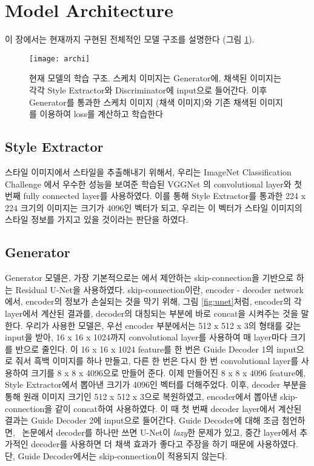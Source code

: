 \section{Model Architecture}
\label{sec:archi}
이 장에서는 현재까지 구현된 전체적인 모델 구조를 설명한다 (그림 \ref{fig:archi}).

\begin{figure}[t]
	\centering
	\texttt{[image: archi]}
	\caption{현재 모델의 학습 구조. 스케치 이미지는 Generator에, 채색된 이미지는 각각 Style Extractor와 Discriminator에 input으로 들어간다. 이후 Generator를 통과한 스케치 이미지 (채색 이미지)와 기존 채색된 이미지를 이용하여 loss를 계산하고 학습한다}
	\label{fig:archi}
\end{figure}

\subsection{Style Extractor}

스타일 이미지에서 스타일을 추출해내기 위해서, 우리는 ImageNet Classification Challenge \cite{Deng2009ImageNet}에서 우수한 성능을 보여준 학습된 VGGNet \cite{Simonyan2014}의 convolutional layer와 첫 번째 fully connected layer를 사용하였다.
이를 통해 Style Extractor를 통과한 224 x 224 크기의 이미지는 크기가 4096인 벡터가 되고, 우리는 이 벡터가 스타일 이미지의 스타일 정보를 가지고 있을 것이라는 판단을 하였다.
\subsection{Generator}

Generator 모델은, 가장 기본적으로는 \stylepaint 에서 제안하는 skip-connection을 기반으로 하는 Residual U-Net을 사용하였다.
skip-connection이란, encoder - decoder network에서, encoder의 정보가 손실되는 것을 막기 위해, 그림 \ref{fig:unet}처럼, encoder의 각 layer에서 계산된 결과를, decoder의 대칭되는 부분에 바로 concat을 시켜주는 것을 말한다.
우리가 사용한 모델은, 우선 encoder 부분에서는 512 x 512 x 3의 형태를 갖는 input을 받아, 16 x 16 x 1024까지 convolutional layer를 사용하여 매 layer마다 크기를 반으로 줄인다.
이 16 x 16 x 1024 feature를 한 번은 Guide Decoder 1의 input으로 줘서 흑백 이미지를 하나 만들고, 다른 한 번은 다시 한 번 convolutional layer를 사용하여 크기를 8 x 8 x 4096으로 만들어 준다.
이제 만들어진 8 x 8 x 4096 feature에, Style Extractor에서 뽑아낸 크기가 4096인 벡터를 더해주었다.
이후, decoder 부분을 통해 원래 이미지 크기인 512 x 512 x 3으로 복원하였고, encoder에서 뽑아낸 skip-connection을 같이 concat하여 사용하였다.
이 때 첫 번째 decoder layer에서 계산된 결과는 Guide Decoder 2에 input으로 들어간다. Guide Decoder에 대해 조금 첨언하면, \stylepaint~논문에서 decoder를 하나만 쓰면 U-Net이 \textit{lazy}한 문제가 있고, 중간 layer에서 추가적인 decoder를 사용하면 더 채색 효과가 좋다고 주장을 하기 때문에 사용하였다.
단, Guide Decoder에서는 skip-connection이 적용되지 않는다.

